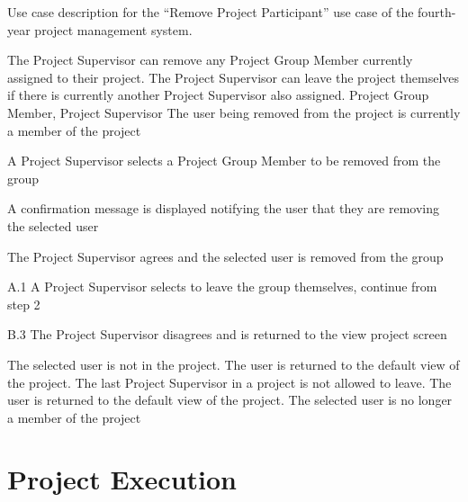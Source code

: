 \documentclass[document.tex]{subfiles}
\begin{document}
\begin{table}[!htbp]
  \centering
  \caption{Use case description for the ``Remove Project Participant'' use case of the fourth-year project management system.}
  \label{tbl:use-case-leave-project}

  \begin{usecase}
    The Project Supervisor can remove any Project Group Member currently assigned to their project. The Project Supervisor can leave the project themselves if there is currently another Project Supervisor also assigned.
    Project Group Member, Project Supervisor
    The user being removed from the project is currently a member of the project
    \ucnormal
    \begin{ucenum}
      \item A Project Supervisor selects a Project Group Member to be removed from the group
      \item A confirmation message is displayed notifying the user that they are removing the selected user
      \item The Project Supervisor agrees and the selected user is removed from the group
    \end{ucenum}
    \begin{ucenum*}
      \item [A.1] A Project Supervisor selects to leave the group themselves, continue from step 2
    \end{ucenum*}
    \begin{ucenum}
      \item [B.3] The Project Supervisor disagrees and is returned to the view project screen
    \end{ucenum}
    The selected user is not in the project. The user is returned to the default view of the project.
    The last Project Supervisor in a project is not allowed to leave. The user is returned to the default view of the project.
    The selected user is no longer a member of the project
  \end{usecase}
\end{table}


\FloatBarrier
{}
\section {Project Execution}
\label {sec:detailed-use-cases-1-execution}
\end{document}
